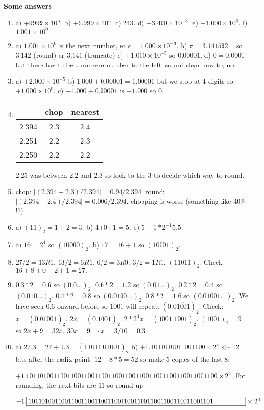\documentclass[12pt,letterpaper,noanswers]{exam}
\begin{document}
\noindent\textbf{Some answers}
\begin{enumerate}
    \item a) $+9999\times 10^5$.  b) $+9.999\times 10^5$.  c) $243$.  d) $-3.400\times 10^{-3}$.  e) $+1.000\times 10^0$.  f) $1.001\times 10^0$ 
    \item a) $1.001\times 10^0$ is the next number, so $\epsilon = 1.000\times10^{-3}$.  b) $\pi = 3.141592...$ so $3.142$ (round) or $3.141$ (truncate) c) $+1.000\times10^{-5}$ so $0.00001$. d) $0 = 0.0000$ but there has to be a nonzero number to the left, so not clear how to, no.
    \item a) $+2.000\times10^{-5}$ b) $1.000 + 0.00001 = 1.00001$ but we stop at $4$ digits so $+1.000\times 10^0$.  c) $-1.000 + 0.00001$ is $-1.000$ so $0$.
    \item \begin{tabular}{c|c|c}
     & chop & nearest \\
     \hline
  2.394   & 2.3& 2.4\\
2.251 & 2.2& 2.3 \\
2.250 & 2.2 & 2.2 \\
\end{tabular}
$2.25$ was between $2.2$ and $2.3$ so look to the $3$ to decide which way to round.
\item chop: $\vert(2.394-2.3)/2.394\vert = 0.94/2.394$.  round: $\vert(2.394-2.4)/2.394\vert = 0.006/2.394$.  chopping is worse (something like 40\% !?)
\item a) $(11)_2 = 1+2 = 3$. b) 4+0+1 = 5.  c) $5+ 1*2^{-1} 5.5$.
\item a) $16 = 2^4$ so $(10000)_2$. b) $17 = 16+1$ so $(10001)_2$.
\item $27/2 = 13 R1$.  $13/2 = 6 R1$.  $6/2 = 3 R0$.  $3/2 = 1 R1$.  $(11011)_2$.  Check: $16+8+0+2+1 = 27.$
\item $0.3*2 = 0.6$ so $(0.0...)_2$.  $0.6*2 = 1.2$ so $(0.01...)_2$.  $0.2*2 = 0.4$ so $(0.010...)_2$.  $0.4*2 = 0.8$ so $(0.0100...)_2$.  $0.8*2 =1.6$ so $(0.01001...)_2$.  We have seen $0.6$ onward before so $1001$ will repeat.  $(0.0\overline{1001})_2$.  Check: $x = (0.0\overline{1001})_2$.  $2x = (0.\overline{1001})_2$.  $2*2^4x = (1001.\overline{1001})_2$.  $(1001)_2 = 9$ so $2x + 9 = 32x$.  $30x = 9 \Rightarrow x = 3/10 = 0.3$
\item a) $27.3 = 27+0.3 = (11011.0\overline{1001})_2$  b) $+1.1011010011001100\times 2^4$ <-- 12 bits after the radix point. $12+8*5 = 52$ so make 5 copies of the last 8:

$+1.10110100110011001100110011001100110011001100110011001100\times 2^4$.  For rounding, the next bits are $11$ so round up

$+1.\framebox[11.7cm][l]{10110100110011001100110011001100110011001100110011001101}\times 2^4$
\end{enumerate}
\end{document}
